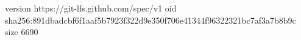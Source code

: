 version https://git-lfs.github.com/spec/v1
oid sha256:891dbadcbf6f1aaf5b7923f322d9e350f706e41344f96322321bc7af3a7b8b9c
size 6690
